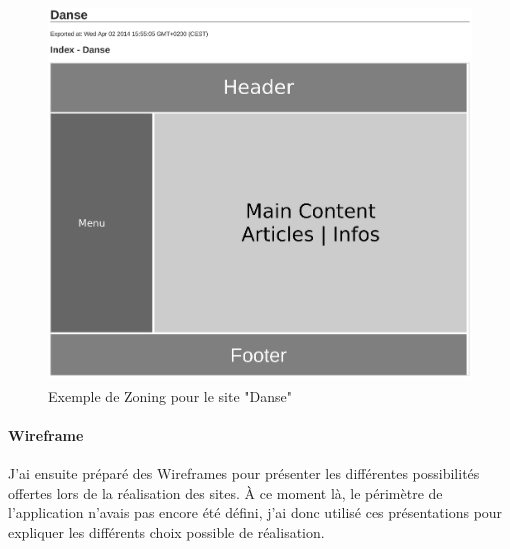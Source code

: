 \documentclass[11pt,a4paper]{report}
\begin{document}
				\begin{figure}[H]
					\centering
					\includegraphics[height=10cm]{Zone-Danse.eps}
					\caption{Exemple de Zoning pour le site "Danse"}
					\label{fig:Zoning Danse}
				\end{figure}

			\paragraph*{Wireframe}J'ai ensuite préparé des Wireframes pour présenter les différentes possibilités offertes lors de la réalisation des sites. À ce moment là, le périmètre de l'application n'avais pas encore été défini, j'ai donc utilisé ces présentations pour expliquer les différents choix possible de réalisation.
\end{document}
